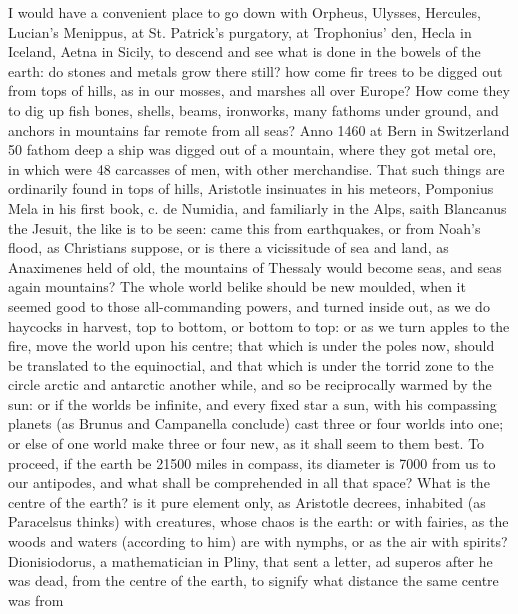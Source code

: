 {I would have a convenient place to go down with Orpheus, Ulysses,
Hercules, Lucian's Menippus, at St. Patrick's purgatory, at
Trophonius' den, Hecla in Iceland, Aetna in Sicily, to descend and see
what is done in the bowels of the earth: do stones and metals grow
there still? how come fir trees to be digged out from tops of
hills, as in our mosses, and marshes all over Europe? How come they to
dig up fish bones, shells, beams, ironworks, many fathoms under ground,
and anchors in mountains far remote from all seas? Anno 1460 at
Bern in Switzerland 50 fathom deep a ship was digged out of a mountain,
where they got metal ore, in which were 48 carcasses of men, with other
merchandise. That such things are ordinarily found in tops of hills,
Aristotle insinuates in his meteors, Pomponius Mela in his first
book, \textlatin{c. de Numidia}, and familiarly in the Alps, saith Blancanus
the Jesuit, the like is to be seen: came this from earthquakes, or from
Noah's flood, as Christians suppose, or is there a vicissitude of sea
and land, as Anaximenes held of old, the mountains of Thessaly would
become seas, and seas again mountains? The whole world belike should be
new moulded, when it seemed good to those all-commanding powers, and
turned inside out, as we do haycocks in harvest, top to bottom, or
bottom to top: or as we turn apples to the fire, move the world upon
his centre; that which is under the poles now, should be translated to
the equinoctial, and that which is under the torrid zone to the circle
arctic and antarctic another while, and so be reciprocally warmed by
the sun: or if the worlds be infinite, and every fixed star a sun, with
his compassing planets (as Brunus and Campanella conclude) cast three
or four worlds into one; or else of one world make three or four new,
as it shall seem to them best. To proceed, if the earth be 21\thinspace{}500 miles
in compass, its diameter is 7\thinspace{}000 from us to our antipodes, and
what shall be comprehended in all that space? What is the centre of the
earth? is it pure element only, as Aristotle decrees, inhabited (as
 Paracelsus thinks) with creatures, whose chaos is the earth: or
with fairies, as the woods and waters (according to him) are with
nymphs, or as the air with spirits? Dionisiodorus, a mathematician in
Pliny, that sent a letter, ad superos after he was dead, from the
centre of the earth, to signify what distance the same centre was from
}
